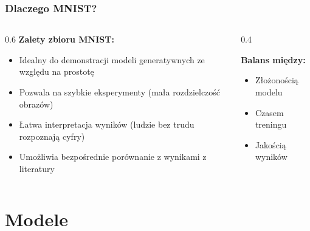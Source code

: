 \documentclass{beamer}
\begin{document}
\begin{frame}
    \frametitle{Dlaczego MNIST?}

    \begin{columns}[T]
        \begin{column}{0.6\textwidth}
            \textbf{Zalety zbioru MNIST:}
            \begin{itemize}
                \item Idealny do demonstracji modeli generatywnych ze względu na prostotę
                \item Pozwala na szybkie eksperymenty (mała rozdzielczość obrazów)
                \item Łatwa interpretacja wyników (ludzie bez trudu rozpoznają cyfry)
                \item Umożliwia bezpośrednie porównanie z wynikami z literatury
            \end{itemize}
        \end{column}

        \begin{column}{0.4\textwidth}
            \vspace{0.5cm}
            \begin{tcolorbox}[colback=yellow!10!white, colframe=black!60, boxrule=0.5pt, arc=3mm]
                \centering
                \textbf{Balans między:}
                \begin{itemize}
                    \item Złożonością modelu
                    \item Czasem treningu
                    \item Jakością wyników
                \end{itemize}
            \end{tcolorbox}
        \end{column}
    \end{columns}
\end{frame}


\section{Modele}
\end{document}
